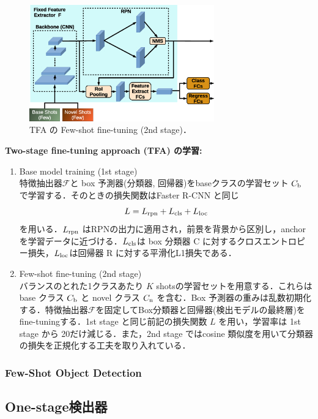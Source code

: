 \documentclass[originalpaper,fleqn]{jsaiart}     %
\begin{document}
\begin{figure}[tb]
    \begin{center}
        \includegraphics[width=8cm,clip]{fig/archi_TFA.eps}
    \end{center}
    \caption{ TFA の Few-shot fine-tuning (2nd stage)．}
    \label{fig:archi_TFA}
\end{figure}
{\bf Two-stage fine-tuning approach (TFA) の学習:\ } 
\begin{enumerate}
    \item Base model training (1st stage) \\
    特徴抽出器$\mathcal{F}$と box 予測器(分類器, 回帰器)をbaseクラスの学習セット $C_{\rm b}$ で学習する．そのときの損失関数はFaster R-CNN \cite{RHGS15}と同じ $$L=L_{\rm rpn}+L_{\rm cls}+L_{\rm loc}$$を用いる．$L_{\rm rpn}$ はRPNの出力に適用され，前景を背景から区別し，anchorを学習データに近づける．$L_{\rm cls}$は box 分類器 C に対するクロスエントロピー損失，$L_{\rm loc}$は回帰器 R に対する平滑化L1損失である．
    \item Few-shot fine-tuning (2nd stage) \\
    バランスのとれた1クラスあたり $K$ shotsの学習セットを用意する．これらは base クラス $C_{\rm b}$ と novel クラス $C_{\rm n}$ を含む．Box 予測器の重みは乱数初期化する．特徴抽出器$\mathcal{F}$を固定してBox分類器と回帰器(検出モデルの最終層)をfine-tuningする．1st stage と同じ前記の損失関数 $L$ を用い，学習率は 1st stage から 20だけ減じる．また，2nd stage ではcosine 類似度を用いて分類器の損失を正規化する工夫を取り入れている．
\end{enumerate}

\subsubsection{Few-Shot Object Detection}

\subsection{One-stage検出器}
\end{document}
